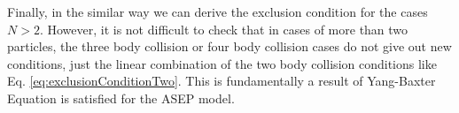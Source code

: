 Finally, in the similar way we can derive the exclusion condition for the cases $N>2$. However, it is not difficult to check that in cases of more than two particles, the three body collision or four body collision cases do not give out new conditions, just the linear combination of the two body collision conditions like Eq. \eqref{eq:exclusionConditionTwo}. This is fundamentally a result of Yang-Baxter Equation is satisfied for the ASEP model.



